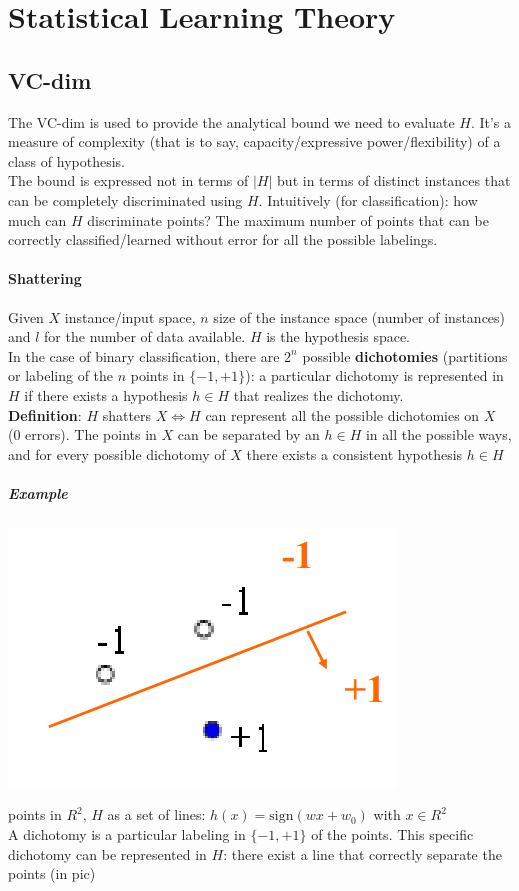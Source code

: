 \documentclass[10pt]{report}
\begin{document}
\section{Statistical Learning Theory}
\subsection{VC-dim} The VC-dim is used to provide the analytical bound we need to evaluate $H$. It's a measure of complexity (that is to say, capacity/expressive power/flexibility) of a class of hypothesis.\\
The bound is expressed not in terms of $|H|$ but in terms of distinct instances that can be completely discriminated using $H$. Intuitively (for classification): how much can $H$ discriminate points? The maximum number of points that can be correctly classified/learned without error for all the possible labelings.
\paragraph{Shattering} Given $X$ instance/input space, $n$ size of the instance space (number of instances) and $l$ for the number of data available. $H$ is the hypothesis space.\\
In the case of binary classification, there are $2^n$ possible \textbf{dichotomies} (partitions or labeling of the $n$ points in $\{-1,+1\}$): a particular dichotomy is represented in $H$ if there exists a hypothesis $h\in H$ that realizes the dichotomy.\\
\textbf{Definition}: $H$ shatters $X \Leftrightarrow H$ can represent all the possible dichotomies on $X$ (0 errors). The points in $X$ can be separated by an $h\in H$ in all the possible ways, and for every possible dichotomy of $X$ there exists a consistent hypothesis $h\in H$
\subparagraph{Example} \begin{multicols}{2}
\begin{center}
	\includegraphics[scale=0.5]{14.png}
\end{center}
 points in $R^2$, $H$ as a set of lines: $h(x) = \text{sign}(wx + w_0)$ with $x\in R^2$\\
A dichotomy is a particular labeling in $\{-1,+1\}$ of the points. This specific dichotomy can be represented in $H$: there exist a line that correctly separate the points (in pic)
\end{multicols}
\end{document}
